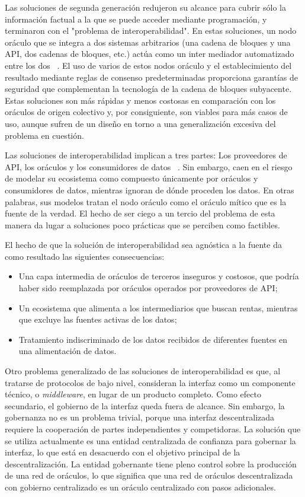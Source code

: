 \documentclass[11pt]{article}
\begin{document}
Las soluciones de segunda generación redujeron su alcance para cubrir sólo la información factual a la que se puede acceder mediante programación, y terminaron con el "problema de interoperabilidad". En estas soluciones, un nodo oráculo que se integra a dos sistemas arbitrarios (una cadena de bloques y una API, dos cadenas de bloques, etc.) actúa como un inter mediador automatizado entre los dos ~\cite{ellis:2017,band,depedro:2017,tellor}.
El uso de varios de estos nodos oráculo y el establecimiento del resultado mediante reglas de consenso predeterminadas proporciona garantías de seguridad que complementan la tecnología de la cadena de bloques subyacente.  Estas soluciones son más rápidas y menos costosas en comparación con los oráculos de origen colectivo y, por consiguiente, son viables para más casos de uso, aunque sufren de un diseño en torno a una generalización excesiva del problema en cuestión.

Las soluciones de interoperabilidad implican a tres partes: Los proveedores de API, los oráculos y los consumidores de datos ~\cite{benligiray:2019}.
Sin embargo, caen en el riesgo de modelar su ecosistema como compuesto únicamente por oráculos y consumidores de datos, mientras ignoran de dónde proceden los datos. En otras palabras, sus modelos tratan el nodo oráculo como el oráculo mítico que es la fuente de la verdad. El hecho de ser ciego a un tercio del problema de esta manera da lugar a soluciones poco prácticas que se perciben como factibles.

El hecho de que la solución de interoperabilidad sea agnóstica a la fuente da como resultado las siguientes consecuencias:
\begin{itemize}
    \item Una capa intermedia de oráculos de terceros inseguros y costosos, que podría haber sido reemplazada por oráculos operados por proveedores de API;
    \item Un ecosistema que alimenta a los intermediarios que buscan rentas, mientras que excluye las fuentes activas de los datos;
    \item Tratamiento indiscriminado de los datos recibidos de diferentes fuentes en una alimentación de datos.
\end{itemize}

Otro problema generalizado de las soluciones de interoperabilidad es que, al tratarse de protocolos de bajo nivel, consideran la interfaz como un componente técnico, o \textit{middleware}, en lugar de un producto completo. Como efecto secundario, el gobierno de la interfaz queda fuera de alcance.   Sin embargo, la gobernanza no es un problema trivial, porque una interfaz descentralizada requiere la cooperación de partes independientes y competidoras. La solución que se utiliza actualmente es una entidad centralizada de confianza para gobernar la interfaz, lo que está en desacuerdo con el objetivo principal de la descentralización.  La entidad gobernante tiene pleno control sobre la producción de una red de oráculos, lo que significa que una red de oráculos descentralizada con gobierno centralizado es un oráculo centralizado con pasos adicionales.
\end{document}
